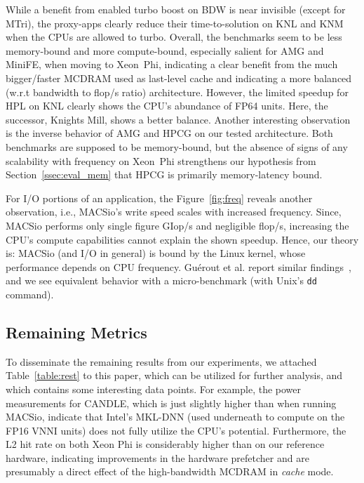 While a benefit from enabled turbo boost on BDW is near invisible (except for MTri), the proxy-apps clearly reduce their
time-to-solution on KNL and KNM when the CPUs are allowed to turbo. Overall, the benchmarks seem to be less memory-bound
and more compute-bound, especially salient for AMG and MiniFE,  when moving to Xeon~Phi, indicating a clear benefit
from the much bigger/faster MCDRAM used as last-level cache and indicating a more balanced
(w.r.t bandwidth to \unit[]{flop/s} ratio) architecture.
However, the limited speedup for HPL on KNL clearly shows the CPU's abundance of FP64 units.
Here, the successor, Knights Mill, shows a better balance.
Another interesting observation is the inverse behavior of AMG and HPCG on our tested architecture.
Both benchmarks are supposed to be memory-bound, but the absence of signs of any scalability with frequency on Xeon~Phi
strengthens our hypothesis from Section~\ref{ssec:eval_mem} that HPCG is primarily memory-latency bound.

For I/O portions of an application, the Figure~\ref{fig:freq} reveals another observation, i.e., MACSio's write speed
scales with increased frequency. Since, MACSio performs only single figure \unit[]{GIop/s} and negligible
\unit[]{flop/s}, increasing the CPU's compute capabilities cannot explain the shown speedup.
Hence, our theory is: MACSio (and I/O in general) is bound by the Linux kernel, whose performance depends on CPU frequency.
Gu{\'e}rout et al. report similar findings~\cite{guerout_energy-aware_2013}, and we see equivalent behavior with 
a micro-benchmark (with Unix's \texttt{dd} command).


\subsection{Remaining Metrics}\label{ssec:eval_rest}
%
To disseminate the remaining results from our experiments, we 
attached Table~\ref{table:rest} to this paper, which can be utilized for
further analysis, and which contains some interesting data points.
For example, the power measurements for CANDLE, which is just slightly
higher than when running MACSio, indicate that Intel's MKL-DNN (used
underneath to compute on the FP16 VNNI units) does not
fully utilize the CPU's potential. Furthermore, the L2 hit rate on both
Xeon Phi is considerably higher than on our reference
hardware, indicating improvements in the hardware prefetcher and are presumably
a direct effect of the high-bandwidth MCDRAM in \textit{cache} mode.

